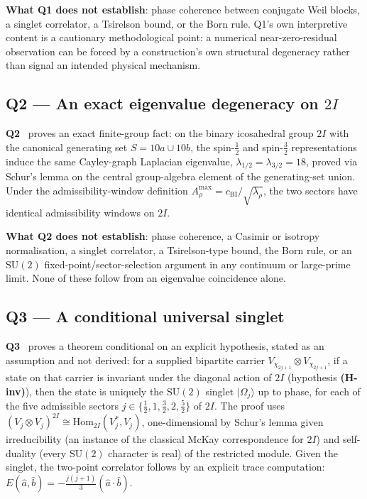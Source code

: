 \documentclass[11pt,a4paper]{article}
\theoremstyle{definition}
\newcommand{\SU}{\mathrm{SU}}
\newcommand{\twoI}{2I}
\begin{document}
      \textbf{What Q1 does not establish}: phase coherence between conjugate Weil blocks, a
      singlet correlator, a Tsirelson bound, or the Born rule. Q1's own interpretive content is a
      cautionary methodological point: a numerical near-zero-residual observation can be forced
      by a construction's own structural degeneracy rather than signal an intended physical
      mechanism.

    \subsection{Q2 --- An exact eigenvalue degeneracy on $\twoI$}
      \label{sec:q2}

      \textbf{Q2}~\cite{Beau2026q2} proves an exact finite-group fact: on the binary icosahedral
      group $\twoI$ with the canonical generating set $S = 10a \cup 10b$, the spin-$\tfrac12$ and
      spin-$\tfrac32$ representations induce the same Cayley-graph Laplacian eigenvalue,
      $\lambda_{1/2} = \lambda_{3/2} = 18$, proved via Schur's lemma on the central group-algebra
      element of the generating-set union. Under the admissibility-window definition
      $A^{\max}_\rho = c_{\mathrm{BI}}/\sqrt{\lambda_\rho}$, the two sectors have identical
      admissibility windows on $\twoI$.

      \textbf{What Q2 does not establish}: phase coherence, a Casimir or isotropy normalisation,
      a singlet correlator, a Tsirelson-type bound, the Born rule, or an $\SU(2)$
      fixed-point/sector-selection argument in any continuum or large-prime limit. None of these
      follow from an eigenvalue coincidence alone.

    \subsection{Q3 --- A conditional universal singlet}
      \label{sec:q3}

      \textbf{Q3}~\cite{Beau2026q3} proves a theorem conditional on an explicit hypothesis,
      stated as an assumption and not derived: for a supplied bipartite carrier
      $V_{\chi_{2j+1}} \otimes V_{\chi_{2j+1}}$, if a state on that carrier is invariant under the
      diagonal action of $\twoI$ (hypothesis \textbf{(H-inv)}), then the state is uniquely the
      $\SU(2)$ singlet $|\Omega_j\rangle$ up to phase, for each of the five admissible sectors
      $j \in \{\tfrac{1}{2}, 1, \tfrac{3}{2}, 2, \tfrac{5}{2}\}$ of $\twoI$. The proof uses
      $(V_j \otimes V_j)^{\twoI} \cong \mathrm{Hom}_{\twoI}(V_j^*, V_j)$, one-dimensional by
      Schur's lemma given irreducibility (an instance of the classical McKay correspondence for
      $\twoI$) and self-duality (every $\SU(2)$ character is real) of the restricted module.
      Given the singlet, the
      two-point correlator follows by an explicit trace computation:
      $E(\hat{a},\hat{b}) = -\tfrac{j(j+1)}{3}(\hat{a}\cdot\hat{b})$.
\end{document}
